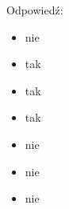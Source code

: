 Odpowiedź:
\begin{itemize}
	\item nie
	\item tak
	\item tak
	\item tak
	\item nie
	\item nie
	\item nie
\end{itemize}
